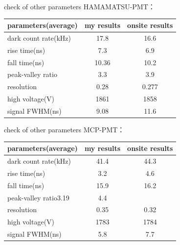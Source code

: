 \documentclass[11pt,compress,xcolor=x11names,UTF8]{beamer}
\begin{document}
\begin{frame}{check of other parameters}
HAMAMATSU-PMT：

\vspace{.5cm}

\centering
\begin{tabular}{l|c|c}
\hline
\hline
parameters(average)&  {\color{Blue} my results} & {\color{Blue}onsite results} \\\hline
dark count rate(kHz)&17.8&16.6\\
rise time(ns)&7.3& 6.9\\
fall time(ns)&10.36& 10.2\\
peak-valley ratio&3.3& 3.9\\
resolution&0.28& 0.277\\
high voltage(V)&1861& 1858\\
signal FWHM(ns)&9.08& 11.6\\
\hline
\end{tabular}


\end{frame}
\begin{frame}{check of other parameters}
MCP-PMT：

\vspace{.5cm}

\centering
\begin{tabular}{l|c|c}
\hline
\hline
parameters(average)&  {\color{Blue} my results} & {\color{Blue}onsite results} \\\hline
dark count rate(kHz)&41.4&44.3\\
rise time(ns)&3.2& 4.6\\
fall time(ns)&15.9& 16.2\\
peak-valley ratio3.19& 4.4\\
resolution&0.35& 0.32\\
high voltage(V)&1783& 1784\\
signal FWHM(ns)&5.8& 7.7\\
\hline
\end{tabular}
\end{frame}
\end{document}

